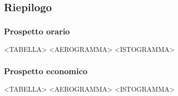 \subsection{Riepilogo}

\subsubsection{Prospetto orario}

<TABELLA>
<AEROGRAMMA>
<ISTOGRAMMA>

\subsubsection{Prospetto economico}

<TABELLA>
<AEROGRAMMA>
<ISTOGRAMMA>

